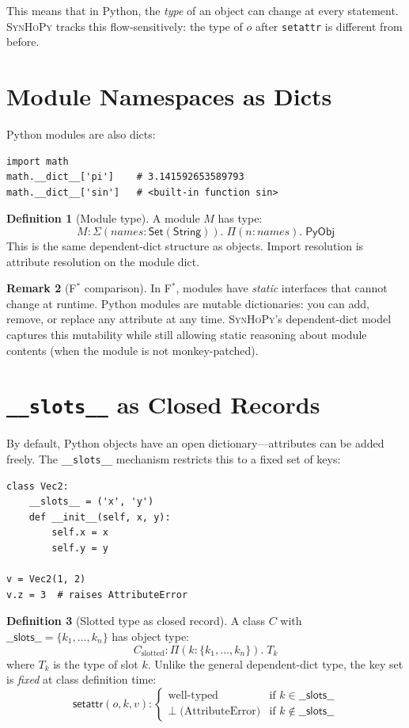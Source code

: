 \documentclass[11pt,a4paper]{report}
\theoremstyle{definition}
\newtheorem{definition}{Definition}[chapter]
\newtheorem{remark}[definition]{Remark}
\theoremstyle{plain}
\newcommand{\PyObj}{\mathsf{PyObj}}
\newcommand{\fstar}{F$^{*}$}
\newcommand{\synhopy}{\textsc{SynHoPy}}
\begin{document}
This means that in Python, the \emph{type} of an object can change at every
statement.  \synhopy{} tracks this flow-sensitively: the type of $o$ after
\texttt{setattr} is different from before.

\section{Module Namespaces as Dicts}

Python modules are also dicts:
\begin{lstlisting}[style=python]
import math
math.__dict__['pi']    # 3.141592653589793
math.__dict__['sin']   # <built-in function sin>
\end{lstlisting}

\begin{definition}[Module type]
A module $M$ has type:
\[
  M : \Sigma(\mathit{names} : \mathsf{Set}(\mathsf{String})).\;
    \Pi(n : \mathit{names}).\; \PyObj
\]
This is the same dependent-dict structure as objects.
Import resolution is attribute resolution on the module dict.
\end{definition}

\begin{remark}[\fstar{} comparison]
In \fstar{}, modules have \emph{static} interfaces that cannot change at runtime.
Python modules are mutable dictionaries: you can add, remove, or replace any
attribute at any time.  \synhopy{}'s dependent-dict model captures this mutability
while still allowing static reasoning about module contents (when the module is
not monkey-patched).
\end{remark}

\section{\texttt{\_\_slots\_\_} as Closed Records}

By default, Python objects have an open dictionary---attributes can be
added freely.  The \lstinline[style=python]{__slots__} mechanism restricts
this to a fixed set of keys:

\begin{lstlisting}[style=python]
class Vec2:
    __slots__ = ('x', 'y')
    def __init__(self, x, y):
        self.x = x
        self.y = y

v = Vec2(1, 2)
v.z = 3  # raises AttributeError
\end{lstlisting}

\begin{definition}[Slotted type as closed record]
A class $C$ with $\mathsf{\_\_slots\_\_} = \{k_1, \ldots, k_n\}$ has
object type:
\[
  C_{\mathrm{slotted}} : \Pi(k : \{k_1, \ldots, k_n\}).\; T_k
\]
where $T_k$ is the type of slot $k$.  Unlike the general dependent-dict
type, the key set is \emph{fixed} at class definition time:
\[
  \mathsf{setattr}(o, k, v) : \begin{cases}
    \text{well-typed} & \text{if } k \in \mathsf{\_\_slots\_\_} \\
    \bot \;\text{(AttributeError)} & \text{if } k \notin \mathsf{\_\_slots\_\_}
  \end{cases}
\]
\end{definition}
\end{document}
